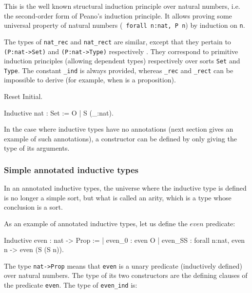 This is the well known structural induction principle over natural
numbers, i.e. the second-order form of Peano's induction principle.
It allows proving some universal property of natural numbers ({\tt
forall n:nat, P n}) by induction on {\tt n}.

The types of {\tt nat\_rec} and {\tt nat\_rect} are similar, except
that they pertain to {\tt (P:nat->Set)} and {\tt (P:nat->Type)}
respectively . They correspond to primitive induction principles
(allowing dependent types) respectively over sorts \verb:Set: and
\verb:Type:. The constant {\ident}{\tt \_ind} is always provided,
whereas {\ident}{\tt \_rec} and {\ident}{\tt \_rect} can be impossible
to derive (for example, when {\ident} is a proposition).

\begin{coq_eval}
Reset Initial.
\end{coq_eval}
\begin{Variants}
\item 
\begin{coq_example*}
Inductive nat : Set := O | S (_:nat).
\end{coq_example*}
In the case where inductive types have no annotations (next section
gives an example of such annotations), 
a constructor can be defined by only giving the type of
its arguments.
\end{Variants}

\subsubsection{Simple annotated inductive types}

In an annotated inductive types, the universe where the inductive
type is defined is no longer a simple sort, but what is called an
arity, which is a type whose conclusion is a sort.

As an example of annotated inductive types, let us define the
$even$ predicate:

\begin{coq_example}
Inductive even : nat -> Prop :=
  | even_0 : even O
  | even_SS : forall n:nat, even n -> even (S (S n)).
\end{coq_example}

The type {\tt nat->Prop} means that {\tt even} is a unary predicate
(inductively defined) over natural numbers.  The type of its two
constructors are the defining clauses of the predicate {\tt even}. The
type of {\tt even\_ind} is:

